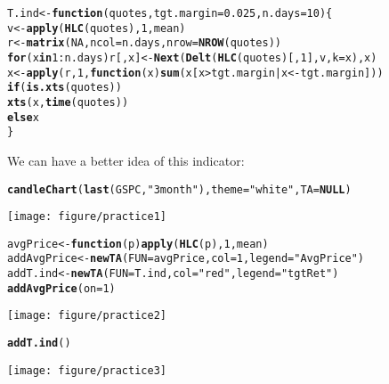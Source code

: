 \documentclass{article}\usepackage[]{graphicx}\usepackage[]{color}
\makeatletter
\def\maxwidth{ %
  \ifdim\Gin@nat@width>\linewidth
    \linewidth
  \else
    \Gin@nat@width
  \fi
}
\newcommand{\hlnum}[1]{\textcolor[rgb]{0.686,0.059,0.569}{#1}}%
\newcommand{\hlstr}[1]{\textcolor[rgb]{0.192,0.494,0.8}{#1}}%
\newcommand{\hlopt}[1]{\textcolor[rgb]{0,0,0}{#1}}%
\newcommand{\hlstd}[1]{\textcolor[rgb]{0.345,0.345,0.345}{#1}}%
\newcommand{\hlkwa}[1]{\textcolor[rgb]{0.161,0.373,0.58}{\textbf{#1}}}%
\newcommand{\hlkwb}[1]{\textcolor[rgb]{0.69,0.353,0.396}{#1}}%
\newcommand{\hlkwc}[1]{\textcolor[rgb]{0.333,0.667,0.333}{#1}}%
\newcommand{\hlkwd}[1]{\textcolor[rgb]{0.737,0.353,0.396}{\textbf{#1}}}%
\newenvironment{kframe}{%
 \def\at@end@of@kframe{}%
 \ifinner\ifhmode%
  \def\at@end@of@kframe{\end{minipage}}%
  \begin{minipage}{\columnwidth}%
 \fi\fi%
 \def\FrameCommand##1{\hskip\@totalleftmargin \hskip-\fboxsep
 \colorbox{shadecolor}{##1}\hskip-\fboxsep
     \hskip-\linewidth \hskip-\@totalleftmargin \hskip\columnwidth}%
 \MakeFramed {\advance\hsize-\width
   \@totalleftmargin\z@ \linewidth\hsize
   \@setminipage}}%
 {\par\unskip\endMakeFramed%
 \at@end@of@kframe}
\newenvironment{knitrout}{}{} %
\makeatother
\begin{document}
\begin{knitrout}
\color{fgcolor}\begin{kframe}
\begin{alltt}
\hlstd{T.ind} \hlkwb{<-} \hlkwa{function}\hlstd{(}\hlkwc{quotes}\hlstd{,} \hlkwc{tgt.margin} \hlstd{=} \hlnum{0.025}\hlstd{,} \hlkwc{n.days} \hlstd{=} \hlnum{10}\hlstd{)\{}
  \hlstd{v} \hlkwb{<-} \hlkwd{apply}\hlstd{(}\hlkwd{HLC}\hlstd{(quotes),} \hlnum{1}\hlstd{, mean)}
  \hlstd{r} \hlkwb{<-} \hlkwd{matrix}\hlstd{(}\hlnum{NA}\hlstd{,} \hlkwc{ncol} \hlstd{= n.days,} \hlkwc{nrow} \hlstd{=} \hlkwd{NROW}\hlstd{(quotes))}
  \hlkwa{for}\hlstd{(x} \hlkwa{in} \hlnum{1}\hlopt{:}\hlstd{n.days) r[ ,x]} \hlkwb{<-} \hlkwd{Next}\hlstd{(}\hlkwd{Delt}\hlstd{(}\hlkwd{HLC}\hlstd{(quotes)[ ,}\hlnum{1}\hlstd{],v,} \hlkwc{k} \hlstd{= x), x)}
  \hlstd{x} \hlkwb{<-} \hlkwd{apply}\hlstd{(r,} \hlnum{1}\hlstd{,} \hlkwa{function}\hlstd{(}\hlkwc{x}\hlstd{)} \hlkwd{sum}\hlstd{(x[x} \hlopt{>} \hlstd{tgt.margin}\hlopt{|}\hlstd{x} \hlopt{< -}\hlstd{tgt.margin]))}
  \hlkwa{if}\hlstd{(}\hlkwd{is.xts}\hlstd{(quotes))}
    \hlkwd{xts}\hlstd{(x,} \hlkwd{time}\hlstd{(quotes))}
  \hlkwa{else} \hlstd{x}
\hlstd{\}}
\end{alltt}
\end{kframe}
\end{knitrout}
We can have a better idea of this indicator:
\begin{knitrout}
\color{fgcolor}\begin{kframe}
\begin{alltt}
\hlkwd{candleChart}\hlstd{(}\hlkwd{last}\hlstd{(GSPC,} \hlstr{"3 month"}\hlstd{),} \hlkwc{theme} \hlstd{=} \hlstr{"white"}\hlstd{,} \hlkwc{TA} \hlstd{=} \hlkwa{NULL}\hlstd{)}
\end{alltt}
\end{kframe}
\texttt{[image: figure/practice1]} 
\begin{kframe}\begin{alltt}
\hlstd{avgPrice} \hlkwb{<-} \hlkwa{function}\hlstd{(}\hlkwc{p}\hlstd{)} \hlkwd{apply}\hlstd{(}\hlkwd{HLC}\hlstd{(p),} \hlnum{1}\hlstd{, mean)}
\hlstd{addAvgPrice} \hlkwb{<-} \hlkwd{newTA}\hlstd{(}\hlkwc{FUN} \hlstd{= avgPrice,} \hlkwc{col} \hlstd{=} \hlnum{1}\hlstd{,} \hlkwc{legend} \hlstd{=} \hlstr{"AvgPrice"}\hlstd{)}
\hlstd{addT.ind} \hlkwb{<-} \hlkwd{newTA}\hlstd{(}\hlkwc{FUN} \hlstd{= T.ind,} \hlkwc{col} \hlstd{=} \hlstr{"red"}\hlstd{,} \hlkwc{legend} \hlstd{=} \hlstr{"tgtRet"}\hlstd{)}
\hlkwd{addAvgPrice}\hlstd{(}\hlkwc{on} \hlstd{=} \hlnum{1}\hlstd{)}
\end{alltt}
\end{kframe}
\texttt{[image: figure/practice2]} 
\begin{kframe}\begin{alltt}
\hlkwd{addT.ind}\hlstd{()}
\end{alltt}
\end{kframe}
\texttt{[image: figure/practice3]} 

\end{knitrout}
\end{document}
